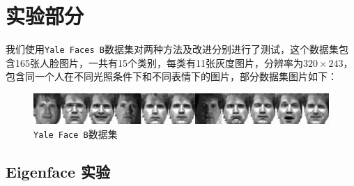\documentclass{ctexart}
\begin{document}
\section{实验部分}
我们使用\texttt{Yale Faces B}\cite{GeBeKr01}数据集对两种方法及改进分别进行了测试，这个数据集包含165张人脸图片，一共有15个类别，每类有11张灰度图片，分辨率为$320\times 243$，包含同一个人在不同光照条件下和不同表情下的图片，部分数据集图片如下：
\begin{figure}[htbp]
    \centering
    \includegraphics[scale=0.7]{imgs/yale-face-B.png}
    \caption{\texttt{Yale Face B}数据集}
\end{figure}
\subsection{Eigenface 实验}
\end{document}
